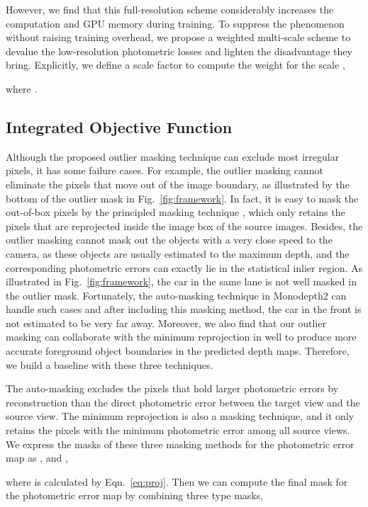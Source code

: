 \documentclass[letterpaper, 10 pt, conference]{ieeeconf}
\begin{document}
However, we find that this full-resolution scheme considerably increases the computation and GPU memory during training.  
To suppress the phenomenon without raising training overhead, we propose a weighted multi-scale scheme to devalue the low-resolution photometric losses and lighten the disadvantage they bring. 
Explicitly, we define a scale factor  to compute the weight for the scale , 
 
where . 


\subsection{Integrated Objective Function}
\label{sec:objective}
Although the proposed outlier masking technique can exclude most irregular pixels, it has some failure cases. 
For example, the outlier masking cannot eliminate the pixels that move out of the image boundary, as illustrated by the bottom of the outlier mask in Fig.~\ref{fig:framework}. 
In fact, it is easy to mask the out-of-box pixels by the principled masking technique \cite{mahjourian2018unsupervised}, which only retains the pixels that are reprojected inside the image box of the source images. 
Besides, the outlier masking cannot mask out the objects with a very close speed to the camera, as these objects are usually estimated to the maximum depth, and the corresponding photometric errors can exactly lie in the statistical inlier region. 
As illustrated in Fig.~\ref{fig:framework}, the car in the same lane is not well masked in the outlier mask. Fortunately, the auto-masking technique in Monodepth2 \cite{godard2019digging} can handle such cases and after including this masking method, the car in the front is not estimated to be very far away. Moreover, we also find that our outlier masking can collaborate with the minimum reprojection in \cite{godard2019digging} well to produce more accurate foreground object boundaries in the predicted depth maps. 
Therefore, we build a baseline with these three techniques. 

The auto-masking excludes the pixels that hold larger photometric errors by reconstruction than the direct photometric error between the target view and the source view. The minimum reprojection is also a masking technique, and it only retains the pixels with the minimum photometric error among all source views. We express the masks of these three masking methods for the photometric error map  as ,  and , 

where  is calculated by Eqn.~\ref{eq:proj}. 
Then we can compute the final mask for the photometric error map  by combining three type masks, 
 
\end{document}
